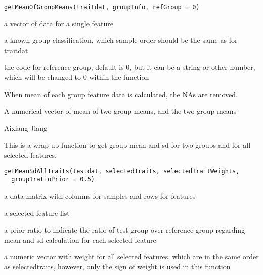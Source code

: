 \documentclass[letterpaper]{book}
\begin{document}
%
\begin{Usage}
\begin{verbatim}
getMeanOfGroupMeans(traitdat, groupInfo, refGroup = 0)
\end{verbatim}
\end{Usage}
%
\begin{Arguments}
\begin{ldescription}
\item[\code{traitdat}] a vector of data for a single feature

\item[\code{groupInfo}] a known group classification, which sample order should be the same as for traitdat

\item[\code{refGroup}] the code for reference group, default is 0, but it can be a string or other number, 
which will be changed to 0 within the function
\end{ldescription}
\end{Arguments}
%
\begin{Details}\relax
When mean of each group feature data is calculated, the NAs are removed.
\end{Details}
%
\begin{Value}
A numerical vector of mean of two group means, and the two group means
\end{Value}
%
\begin{Author}\relax
Aixiang Jiang
\end{Author}
%
\begin{Description}\relax
This is a wrap-up function to get group mean and sd for two groups and for all selected features.
\end{Description}
%
\begin{Usage}
\begin{verbatim}
getMeanSdAllTraits(testdat, selectedTraits, selectedTraitWeights,
  group1ratioPrior = 0.5)
\end{verbatim}
\end{Usage}
%
\begin{Arguments}
\begin{ldescription}
\item[\code{testdat}] a data matrix with columns for samples and rows for features

\item[\code{selectedTraits}] a selected feature list

\item[\code{group1ratioPrior}] a prior ratio to indicate the ratio of test group over reference group 
regarding mean and sd calculation for each selected feature

\item[\code{selectedtraitWeights}] a numeric vector with weight for all selected features, 
which are in the same order as selectedtraits, however, only the sign of weight is used in this function
\end{ldescription}
\end{Arguments}
\end{document}
